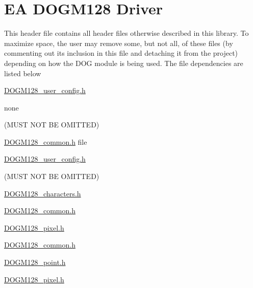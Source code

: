 \hypertarget{group___d_o_g_m128__driver}{\section{E\-A D\-O\-G\-M128 Driver}
\label{group___d_o_g_m128__driver}
}
This header file contains all header files otherwise described in this library. To maximize space, the user may remove some, but not all, of these files (by commenting out its inclusion in this file and detaching it from the project) depending on how the D\-O\-G module is being used. The file dependencies are listed below \par


\hyperlink{_d_o_g_m128__user__config_8h_source}{D\-O\-G\-M128\-\_\-user\-\_\-config.\-h}
\begin{DoxyItemize}
\item none \par
(M\-U\-S\-T N\-O\-T B\-E O\-M\-I\-T\-T\-E\-D)
\end{DoxyItemize}

\hyperlink{_d_o_g_m128__common_8h}{D\-O\-G\-M128\-\_\-common.\-h} file
\begin{DoxyItemize}
\item \hyperlink{_d_o_g_m128__user__config_8h_source}{D\-O\-G\-M128\-\_\-user\-\_\-config.\-h} \par
(M\-U\-S\-T N\-O\-T B\-E O\-M\-I\-T\-T\-E\-D)
\end{DoxyItemize}

\hyperlink{_d_o_g_m128__characters_8h}{D\-O\-G\-M128\-\_\-characters.\-h}
\begin{DoxyItemize}
\item \hyperlink{_d_o_g_m128__common_8h}{D\-O\-G\-M128\-\_\-common.\-h}
\end{DoxyItemize}

\hyperlink{_d_o_g_m128__pixel_8h}{D\-O\-G\-M128\-\_\-pixel.\-h}
\begin{DoxyItemize}
\item \hyperlink{_d_o_g_m128__common_8h}{D\-O\-G\-M128\-\_\-common.\-h}
\end{DoxyItemize}

\hyperlink{_d_o_g_m128__point_8h_source}{D\-O\-G\-M128\-\_\-point.\-h}
\begin{DoxyItemize}
\item \hyperlink{_d_o_g_m128__pixel_8h}{D\-O\-G\-M128\-\_\-pixel.\-h}
\end{DoxyItemize}

